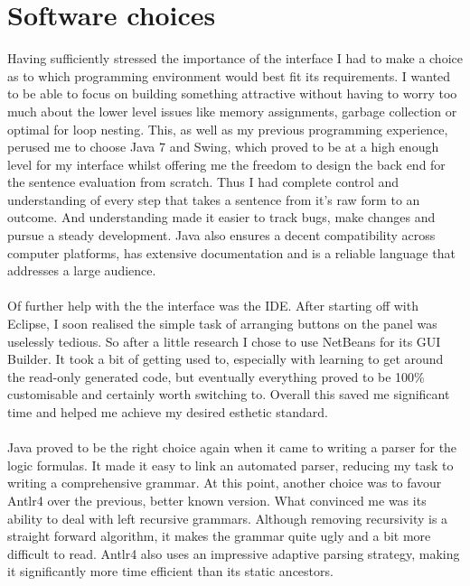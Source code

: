 \documentclass{report}
\begin{document}
\section{Software choices}
Having sufficiently stressed the importance of the interface I had to make a 
choice as to which programming environment would best fit its requirements. I 
wanted to be able to focus on building something attractive without having to 
worry too much about the lower level issues like memory assignments, garbage 
collection or optimal for loop nesting. This, as well as my previous programming 
experience, perused me to choose Java 7\cite{javaAPI} and Swing\cite{javaTUT}, 
which proved to be at a high enough level for my interface whilst offering me 
the freedom to design the back end for the sentence evaluation from scratch. 
Thus I had complete control and understanding of every step that takes a 
sentence from it's raw form to an outcome. And understanding made it easier to 
track bugs, make changes and pursue a steady development. Java also ensures a 
decent compatibility across computer platforms, has extensive documentation and 
is a reliable language that addresses a large audience. 
\\ \\
Of further help with the the interface was the IDE. After starting off with 
Eclipse, I soon realised the simple task of arranging buttons on the panel was 
uselessly tedious. So after a little research I chose to use NetBeans for its 
GUI Builder. It took a bit of getting used to, especially with learning to get 
around the read-only generated code, but eventually everything proved to be 
100\% customisable and certainly worth switching to. Overall this saved me 
significant time and helped me achieve my desired esthetic standard. 
\\ \\
Java proved to be the right choice again when it came to writing a parser for 
the logic formulas. It made it easy to link an automated parser, reducing my 
task to writing a comprehensive grammar. At this point, another choice was to 
favour Antlr4\cite{antlr4} over the previous, better known version. What 
convinced me was its ability to deal with left recursive grammars. Although 
removing recursivity is a straight forward algorithm\cite{compilers}, it makes 
the grammar quite ugly and a bit more difficult to read. Antlr4 also uses an 
impressive adaptive parsing strategy, making it significantly more time 
efficient than its static ancestors.
\\ \\
\end{document}
